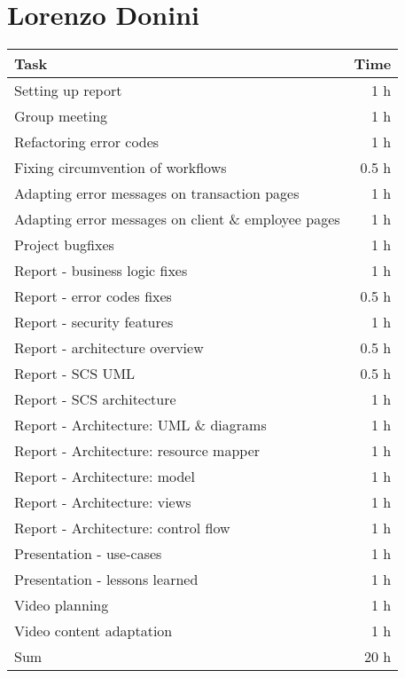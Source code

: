 \section*{Lorenzo Donini}
\begin{table}[h!tpb]
  \centering
  \begin{tabularx}{\textwidth}{X r}
    \toprule
      Task & Time \\
    \midrule
      Setting up report & 1 h \\      
      Group meeting & 1 h \\
      Refactoring error codes & 1 h \\
      Fixing circumvention of workflows & 0.5 h \\
      Adapting error messages on transaction pages & 1 h \\
      Adapting error messages on client \& employee pages & 1 h \\
      Project bugfixes & 1 h \\
      Report - business logic fixes & 1 h \\
      Report - error codes fixes & 0.5 h \\      
      Report - security features & 1 h \\      
      Report - architecture overview & 0.5 h \\
      Report - SCS UML & 0.5 h \\
      Report - SCS architecture & 1 h \\
      Report - Architecture: UML \& diagrams & 1 h \\
      Report - Architecture: resource mapper & 1 h \\
      Report - Architecture: model & 1 h \\
      Report - Architecture: views & 1 h \\
      Report - Architecture: control flow & 1 h \\
      Presentation - use-cases & 1 h \\
      Presentation - lessons learned & 1 h \\
      Video planning & 1 h \\
      Video content adaptation & 1 h \\
    \midrule
      Sum & 20 h \\
    \bottomrule
  \end{tabularx}
\end{table}

\clearpage
